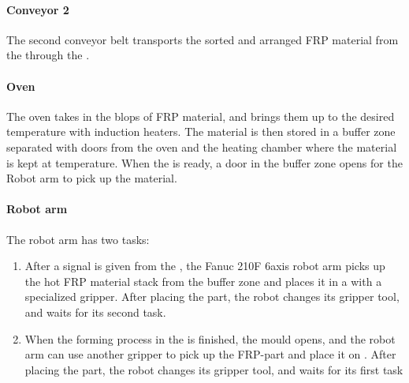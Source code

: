 \paragraph{Conveyor 2} \label{sec:conveyor2}
The second conveyor belt transports the sorted and arranged \ac{FRP} material from the  through the . 

\paragraph{Oven}\label{sec:oven}
The oven takes in the blops of \ac{FRP} material, and brings them up to the desired temperature with induction heaters. The material is then stored in a buffer zone separated with doors from the oven and the heating chamber where the material is kept at temperature. When the  is ready, a door in the buffer zone opens for the Robot arm to pick up the material.


\paragraph{Robot arm} \label{sec:RobotArm}
The robot arm has two tasks:
\begin{enumerate}
	\item After a signal is given from the , the Fanuc 210F 6axis robot arm picks up the hot \ac{FRP} material stack from the buffer zone and places it in a  with a specialized gripper. 
	After placing the part, the robot changes its gripper tool, and waits for its second task.
	\item When the forming process in the  is finished, the mould opens, and the robot arm %
	can use another gripper to pick up  the \ac{FRP}-part and place it on .
	After placing the part, the robot changes its gripper tool, and waits for its first task
\end{enumerate}


